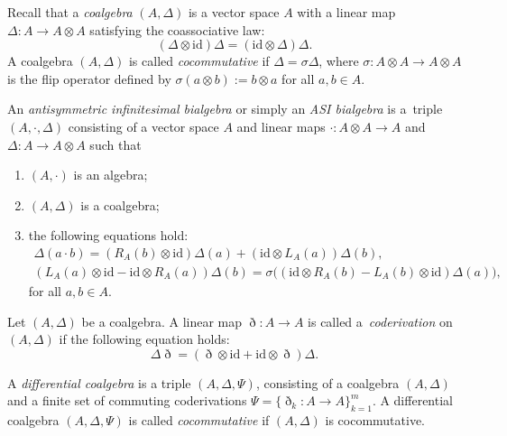\documentclass[10pt,a4paper]{amsart}
\numberwithin{equation}{section}
\newcommand{\id}{\mathrm{id}}
\begin{document}
Recall that a \textit{coalgebra} $(A, \Delta)$ is a vector space $A$ with a linear map $\Delta\colon A \to A \otimes A$ satisfying the coassociative law:
\begin{equation*}
 (\Delta \otimes \id)\Delta = (\id \otimes \Delta) \Delta.
\end{equation*}
A coalgebra $(A, \Delta)$ is called \textit{cocommutative}
if $\Delta = \sigma \Delta$,
where $\sigma\colon A \otimes A \to A \otimes A$ is the flip
operator defined by $\sigma(a \otimes b) := b \otimes a$ for all $a, b \in A$.

\begin{Definition}\label{def:asi_bialgebra}
An \textit{antisymmetric infinitesimal bialgebra} or simply an \textit{ASI bialgebra} is a~triple $(A, \cdot, \Delta)$ consisting of a vector space $A$ and linear maps $\cdot\colon A \otimes A \to A$ and $\Delta\colon A \to A \otimes A$ such that
 \begin{enumerate}\itemsep=0pt
 \item[(1)] $(A, \cdot)$ is an algebra;
 \item[(2)] $(A, \Delta)$ is a coalgebra;
 \item[(3)] the following equations hold:
 \begin{gather}
 \Delta(a \cdot b) = (R_A(b) \otimes \id )\Delta(a) + (\id \otimes L_A(a)) \Delta(b), \label{eq:asiifs} \\
 (L_A(a) \otimes \id - \id \otimes R_A(a))\Delta(b) = \sigma \big( (\id \otimes R_A(b) - L_A(b) \otimes \id )\Delta(a) \big), \label{eq:asisym}
 \end{gather}
 	for all $a, b \in A$.
 \end{enumerate}
\end{Definition}

\begin{Definition}\label{def:coderivation}
Let $(A, \Delta)$ be a coalgebra.
 A linear map $\eth\colon A \to A$ is called a~\textit{coderivation} on $(A, \Delta)$ if the following equation holds:
 \begin{equation}
 \Delta \eth = (\eth \otimes \id + \id \otimes \eth) \Delta. \label{eq:coderivation}
 \end{equation}
\end{Definition}

\begin{Definition}
 A \textit{differential coalgebra} is a triple $(A, \Delta, \Psi)$,
 consisting of a coalgebra $(A, \Delta)$ and a finite set of commuting coderivations $\Psi = \{\eth_k\colon A \to A\}_{k=1}^m$.
 A differential coalgebra $(A, \Delta, \Psi)$ is called \textit{cocommutative} if $(A, \Delta)$ is cocommutative.
\end{Definition}
\end{document}
